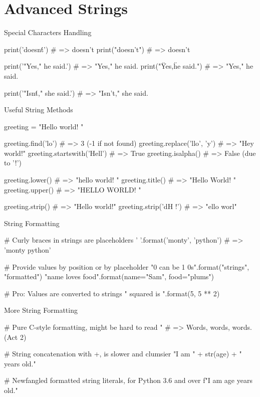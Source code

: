 \documentclass[serif, aspectratio=169]{beamer}
\begin{document}
\section{Advanced Strings}

\begin{frame}[fragile]{Special Characters Handling}
    \begin{pythoncode}
    print('doesn\'t')               # => doesn't
    print("doesn't")                # => doesn't

    print('"Yes," he said.')        # => "Yes," he said.
    print("\"Yes,\" he said.")      # => "Yes," he said.
    
    print('"Isn\'t," she said.')    # => "Isn't," she said.
    \end{pythoncode}
\end{frame}

\begin{frame}[fragile]{Useful String Methods}
    \begin{pythoncode}
    greeting = "Hello world! "

    greeting.find('lo')             # => 3 (-1 if not found)
    greeting.replace('llo', 'y')    # => "Hey world!"
    greeting.startswith('Hell')     # => True
    greeting.isalpha()              # => False (due to '!')

    greeting.lower()                # => "hello world! "
    greeting.title()                # => "Hello World! "
    greeting.upper()                # => "HELLO WORLD! "

    greeting.strip()                # => "Hello world!"
    greeting.strip('dH !')          # => "ello worl"
    \end{pythoncode}
\end{frame}

\begin{frame}[fragile]{String Formatting}
    \begin{pythoncode}
    # Curly braces in strings are placeholders
    '{} {}'.format('monty', 'python')
    # => 'monty python'

    # Provide values by position or by placeholder
    "{0} can be {1} {0}s".format("strings", "formatted")
    "{name} loves {food}".format(name="Sam", food="plums")
    
    # Pro: Values are converted to strings
    "{} squared is {}".format(5, 5 ** 2)
    \end{pythoncode}
\end{frame}

\begin{frame}[fragile]{More String Formatting}
    \begin{pythoncode}
    # Pure C-style formatting, might be hard to read
    "%
    # => Words, words, words. (Act 2)

    # String concatenation with +, is slower and clumsier
    "I am " + str(age) + " years old."

    # Newfangled formatted string literals, for Python 3.6 and over
    f"I am {age} years old."
    \end{pythoncode}
\end{frame}
\end{document}
